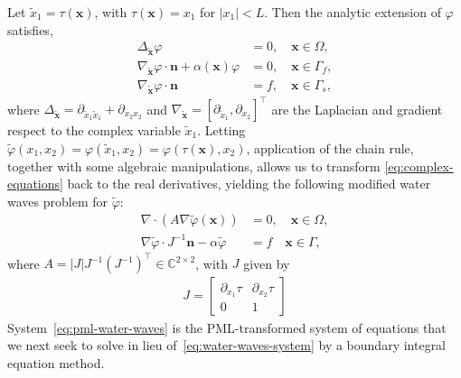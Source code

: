 \documentclass[11pt]{article}
\newcommand{\C}{\mathbb{C}}
\newcommand{\bn}{\mathbf{n}}
\newcommand{\bx}{\mathbf{x}}
\newcommand{\tvarphi}{\tilde \varphi}
\begin{document}
Let $\tilde{x}_1 = \tau(\bx)$, with $\tau(\bx) = x_1$ for $|x_1| < L$. Then the
analytic extension of $\varphi$ satisfies, 
\begin{subequations}
  \label{eq:complex-equations}  
  \begin{align}  
      \label{eq:pml-laplace-equation}
      \Delta_{\tilde{\bx}} \varphi &=0, \quad \bx \in \Omega,\\
      \label{eq:pml-bc1} 
      \nabla_{\tilde{\bx}} \varphi \cdot \bn + \alpha(\bx) \varphi &=0, \quad \bx \in \Gamma_{f},\\
      \label{eq:pml-bc2} 
      \nabla_{\tilde{\bx}} \varphi \cdot \bn &=  f,  \quad \bx \in \Gamma_{s},
  \end{align}
\end{subequations}
where $\Delta_{\tilde{\bx}} = \partial_{\tilde{x}_1 \tilde{x}_1} + \partial_{x_2
x_2}$ and $\nabla_{\tilde{\bx}} = \left[\partial_{\tilde{x}_1},\partial_{x_2}
\right]^\top$ are the Laplacian and gradient respect to the complex variable
$\tilde{x}_1$. Letting $\tvarphi(x_1,x_2) = \varphi(\tilde{x}_1,x_2) =
\varphi(\tau(\bx),x_2)$, application of the chain rule, together with some
algebraic manipulations, allows us to transform \cref{eq:complex-equations} back
to the real derivatives, yielding the following modified water waves problem for
$\tilde{\varphi}$:
\begin{subequations}
  \label{eq:pml-water-waves}  
  \begin{align}
      \label{eq:pml-laplace-real}
      \nabla \cdot \left( A \nabla \tvarphi(\bx) \right) &= 0, \quad \bx \in \Omega,\\
      \label{eq:pml-bc-real} 
      \nabla \tvarphi \cdot J^{-1}\bn - \alpha \tvarphi &= f \quad \bx \in \Gamma,
  \end{align}
\end{subequations}
where $A = |J|J^{-1}(J^{-1})^\top \in \C^{2 \times 2}$, with $J$ given by
\begin{align}
  J =   
  \begin{bmatrix}
    \partial_{x_1} \tau & \partial_{x_2} \tau\\
    0 & 1
  \end{bmatrix}
\end{align}
System~\cref{eq:pml-water-waves} is the PML-transformed system of equations that
we next seek to solve in lieu of~\cref{eq:water-waves-system} by a boundary
integral equation method.
\end{document}
